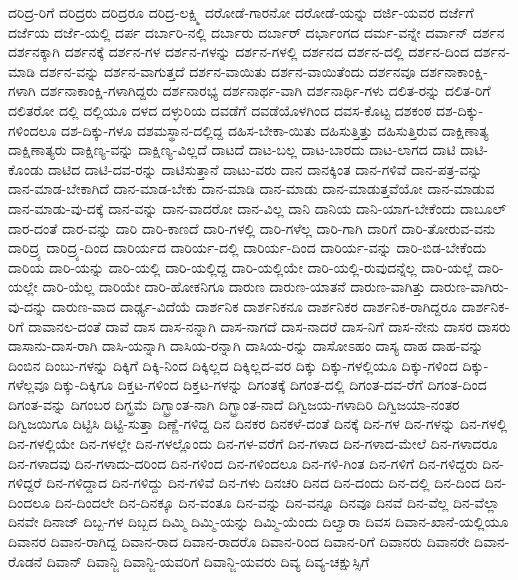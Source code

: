 {ದರಿದ್ರ-ರಿಗೆ
ದರಿದ್ರರು
ದರಿದ್ರರೂ
ದರಿದ್ರ-ಲಕ್ಷ್ಮಿ
ದರೋಡೆ-ಗಾರನೋ
ದರೋಡೆ-ಯನ್ನು
ದರ್ಜಿ-ಯವರ
ದರ್ಜೆಗೆ
ದರ್ಜೆಯ
ದರ್ಜೆ-ಯಲ್ಲಿ
ದರ್ಪ
ದರ್ಬಾರಿ-ನಲ್ಲಿ
ದರ್ಬಾರು
ದರ್ಬಾರ್
ದರ್ಭಾಂಗದ
ದರ್ಮ-ವನ್ನೇ
ದರ್ವಾನ್
ದರ್ಶನ
ದರ್ಶನಕ್ಕಾಗಿ
ದರ್ಶನಕ್ಕೆ
ದರ್ಶನ-ಗಳ
ದರ್ಶನ-ಗಳನ್ನು
ದರ್ಶನ-ಗಳಲ್ಲಿ
ದರ್ಶನದ
ದರ್ಶನ-ದಲ್ಲಿ
ದರ್ಶನ-ದಿಂದ
ದರ್ಶನ-ಮಾಡಿ
ದರ್ಶನ-ವನ್ನು
ದರ್ಶನ-ವಾಗುತ್ತದೆ
ದರ್ಶನ-ವಾಯಿತು
ದರ್ಶನ-ವಾಯಿತೆಂದು
ದರ್ಶನವೂ
ದರ್ಶನಾಕಾಂಕ್ಷಿ-ಗಳಾಗಿ
ದರ್ಶನಾಕಾಂಕ್ಷಿ-ಗಳಾಗಿದ್ದರು
ದರ್ಶನಾರಭ್ಯ
ದರ್ಶನಾರ್ಥ-ವಾಗಿ
ದರ್ಶನಾರ್ಥಿ-ಗಳು
ದಲಿತ-ರನ್ನು
ದಲಿತ-ರಿಗೆ
ದಲಿತರೋ
ದಲ್ಲಿ
ದಲ್ಲಿಯೂ
ದಳದ
ದಳ್ಳುರಿಯ
ದವಡೆಗೆ
ದವಡೆಯೊಳಗಿಂದ
ದವಸ-ಕೊಟ್ಟ
ದಶಕಂಠ
ದಶ-ದಿಕ್ಕು-ಗಳಿಂದಲೂ
ದಶ-ದಿಕ್ಕು-ಗಳೂ
ದಶಮಸ್ಥಾನ-ದಲ್ಲಿದ್ದ
ದಹಿಸ-ಬೇಕಾ-ಯಿತು
ದಹಿಸುತ್ತಿತ್ತು
ದಹಿಸುತ್ತಿರುವ
ದಾಕ್ಷಿಣಾತ್ಯ
ದಾಕ್ಷಿಣಾತ್ಯರು
ದಾಕ್ಷಿಣ್ಯ-ವನ್ನು
ದಾಕ್ಷಿಣ್ಯ-ವಿಲ್ಲದೆ
ದಾಟದೆ
ದಾಟ-ಬಲ್ಲ
ದಾಟ-ಬಾರದು
ದಾಟ-ಲಾಗದ
ದಾಟಿ
ದಾಟಿ-ಕೊಂಡು
ದಾಟಿದ
ದಾಟಿ-ದವ-ರನ್ನು
ದಾಟಿಸುತ್ತಾನೆ
ದಾಟು-ವರು
ದಾನ
ದಾನಕ್ಕಿಂತ
ದಾನ-ಗಳಿವೆ
ದಾನ-ಪತ್ರ-ವನ್ನು
ದಾನ-ಮಾಡ-ಬೇಕಾಗಿದೆ
ದಾನ-ಮಾಡ-ಬೇಕು
ದಾನ-ಮಾಡಿ
ದಾನ-ಮಾಡು
ದಾನ-ಮಾಡುತ್ತವೆಯೋ
ದಾನ-ಮಾಡುವ
ದಾನ-ಮಾಡು-ವು-ದಕ್ಕೆ
ದಾನ-ವನ್ನು
ದಾನ-ವಾದರೋ
ದಾನ-ವಿಲ್ಲ
ದಾನಿ
ದಾನಿಯ
ದಾನಿ-ಯಾಗ-ಬೇಕೆಂದು
ದಾಬೂಲ್
ದಾರ-ದಂತೆ
ದಾರ-ವನ್ನು
ದಾರಿ
ದಾರಿ-ಕಾಣದೆ
ದಾರಿ-ಗಳಲ್ಲಿ
ದಾರಿ-ಗಳೆಲ್ಲ
ದಾರಿ-ಗಾಗಿ
ದಾರಿಗೆ
ದಾರಿ-ತೋರುವ-ವನು
ದಾರಿದ್ರ್ಯ
ದಾರಿದ್ರ್ಯ-ದಿಂದ
ದಾರಿರ್ಯದ
ದಾರಿರ್ಯ-ದಲ್ಲಿ
ದಾರಿರ್ಯ-ದಿಂದ
ದಾರಿರ್ಯ-ವನ್ನು
ದಾರಿ-ಬಿಡ-ಬೇಕೆಂದು
ದಾರಿಯ
ದಾರಿ-ಯನ್ನು
ದಾರಿ-ಯಲ್ಲಿ
ದಾರಿ-ಯಲ್ಲಿದ್ದ
ದಾರಿ-ಯಲ್ಲಿಯೇ
ದಾರಿ-ಯಲ್ಲಿ-ರುವುದನ್ನೆಲ್ಲ
ದಾರಿ-ಯಲ್ಲೆ
ದಾರಿ-ಯಲ್ಲೇ
ದಾರಿ-ಯೆಲ್ಲ
ದಾರಿಯೇ
ದಾರಿ-ಹೋಕನಿಗೂ
ದಾರುಣ
ದಾರುಣ-ಯಾತನೆ
ದಾರುಣ-ವಾಗಿತ್ತು
ದಾರುಣ-ವಾಗಿರು-ವು-ದನ್ನು
ದಾರುಣ-ವಾದ
ದಾರ್ಢ್ಯ-ವಿದೆಯೆ
ದಾರ್ಶನಿಕ
ದಾರ್ಶನಿಕನೂ
ದಾರ್ಶನಿಕರ
ದಾರ್ಶನಿಕ-ರಾಗಿದ್ದರೂ
ದಾರ್ಶನಿಕ-ರಿಗೆ
ದಾವಾನಲ-ದಂತೆ
ದಾವೆ
ದಾಸ
ದಾಸ-ನನ್ನಾಗಿ
ದಾಸ-ನಾಗದೆ
ದಾಸ-ನಾದರೆ
ದಾಸ-ನಿಗೆ
ದಾಸ-ನೇನು
ದಾಸರ
ದಾಸರು
ದಾಸಾನು-ದಾಸ-ರಾಗಿ
ದಾಸಿ-ಯನ್ನಾಗಿ
ದಾಸಿಯ-ರನ್ನಾಗಿ
ದಾಸಿಯ-ರನ್ನು
ದಾಸೋಽಹಂ
ದಾಸ್ಯ
ದಾಹ
ದಾಹ-ವನ್ನು
ದಿಂಬಿನ
ದಿಂಬು-ಗಳನ್ನು
ದಿಕ್ಕಿಗೆ
ದಿಕ್ಕಿ-ನಿಂದ
ದಿಕ್ಕಿಲ್ಲದ
ದಿಕ್ಕಿಲ್ಲದ-ವರ
ದಿಕ್ಕು
ದಿಕ್ಕು-ಗಳಲ್ಲಿಯೂ
ದಿಕ್ಕು-ಗಳಿಂದ
ದಿಕ್ಕು-ಗಳೆಲ್ಲವೂ
ದಿಕ್ಕು-ದಿಕ್ಕಿಗೂ
ದಿಕ್ತಟ-ಗಳಿಂದ
ದಿಕ್ತಟ-ಗಳನ್ನು
ದಿಗಂತಕ್ಕೆ
ದಿಗಂತ-ದಲ್ಲಿ
ದಿಗಂತ-ದವ-ರೆಗೆ
ದಿಗಂತ-ದಿಂದ
ದಿಗಂತ-ವನ್ನು
ದಿಗಂಬರ
ದಿಗ್ಭ್ರಮೆ
ದಿಗ್ಭ್ರಾಂತ-ನಾಗಿ
ದಿಗ್ಭ್ರಾಂತ-ನಾದೆ
ದಿಗ್ವಿಜಯ-ಗಳಾದಿರಿ
ದಿಗ್ವಿಜಯಾ-ನಂತರ
ದಿಗ್ವಿಜಯಿಗೂ
ದಿಟ್ಟಿಸಿ
ದಿಟ್ಟಿ-ಸುತ್ತಾ
ದಿಣ್ಣೆ-ಗಳಿದ್ದ
ದಿನ
ದಿನಕರ
ದಿನಕಳೆ-ದಂತೆ
ದಿನಕ್ಕೆ
ದಿನ-ಗಳ
ದಿನ-ಗಳನ್ನು
ದಿನ-ಗಳಲ್ಲಿ
ದಿನ-ಗಳಲ್ಲಿಯೇ
ದಿನ-ಗಳಲ್ಲೇ
ದಿನ-ಗಳಲ್ಲೊಂದು
ದಿನ-ಗಳ-ವರೆಗೆ
ದಿನ-ಗಳಾದ
ದಿನ-ಗಳಾದ-ಮೇಲೆ
ದಿನ-ಗಳಾದರೂ
ದಿನ-ಗಳಾದವು
ದಿನ-ಗಳಾದು-ದರಿಂದ
ದಿನ-ಗಳಿಂದ
ದಿನ-ಗಳಿಂದಲೂ
ದಿನ-ಗಳಿ-ಗಿಂತ
ದಿನ-ಗಳಿಗೆ
ದಿನ-ಗಳಿದ್ದರು
ದಿನ-ಗಳಿದ್ದರೆ
ದಿನ-ಗಳಿದ್ದಾದ
ದಿನ-ಗಳಿದ್ದು
ದಿನ-ಗಳಿವೆ
ದಿನ-ಗಳು
ದಿನಚರಿ
ದಿನದ
ದಿನ-ದಂದು
ದಿನ-ದಲ್ಲಿ
ದಿನ-ದಿಂದ
ದಿನ-ದಿಂದಲೂ
ದಿನ-ದಿಂದಲೇ
ದಿನ-ದಿನಕ್ಕೂ
ದಿನ-ವಂತೂ
ದಿನ-ವನ್ನು
ದಿನ-ವನ್ನೂ
ದಿನವೂ
ದಿನವೆ
ದಿನ-ವೆಲ್ಲ
ದಿನ-ವೆಲ್ಲಾ
ದಿನವೇ
ದಿನಾಜ್
ದಿಬ್ಬ-ಗಳ
ದಿಬ್ಬದ
ದಿಮ್ಮಿ
ದಿಮ್ಮಿ-ಯನ್ನು
ದಿಮ್ಮಿ-ಯೆಂದು
ದಿಲ್ವಾರಾ
ದಿವಸ
ದಿವಾನ-ಖಾನೆ-ಯಲ್ಲಿಯೂ
ದಿವಾನರ
ದಿವಾನ-ರಾಗಿದ್ದ
ದಿವಾನ-ರಾದ
ದಿವಾನ-ರಾದರೊ
ದಿವಾನ-ರಿಂದ
ದಿವಾನ-ರಿಗೆ
ದಿವಾನರು
ದಿವಾನರೇ
ದಿವಾನ-ರೊಡನೆ
ದಿವಾನ್
ದಿವಾನ್ಜಿ
ದಿವಾನ್ಜಿ-ಯವರಿಗೆ
ದಿವಾನ್ಜಿ-ಯವರು
ದಿವ್ಯ
ದಿವ್ಯ-ಚಕ್ಷುಸ್ಸಿಗೆ
}
